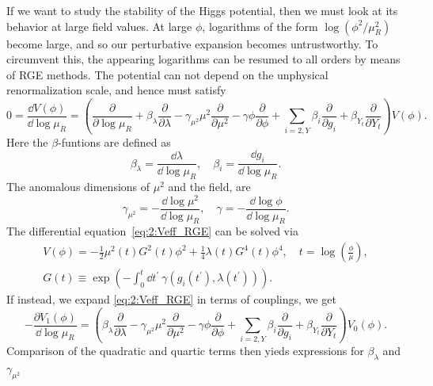 If we want to study the stability of the Higgs potential, then we must look at its behavior at large field values. At large $\phi$, logarithms of the form $\log (\phi^2/\mu_R^2)$ become large, and so our perturbative expansion becomes untrustworthy. To circumvent this, the appearing logarithms can be resumed to all orders by means of \acs{RGE} methods. The potential can not depend on the unphysical renormalization scale, and hence must satisfy
\begin{equation}
0 = \frac{\dd V(\phi)}{\dd \log \mu_R} = \left( \frac{\partial}{\partial \log \mu_R} + \beta_\lambda \frac{\partial}{\partial \lambda} - \gamma_{\mu^2} \mu^2 \frac{\partial}{\partial \mu^2} - \gamma \phi \frac{\partial}{\partial \phi} + \sum_{i= 2, Y} \beta_i \frac{\partial }{\partial g_i} + \beta_{Y_t} \frac{\partial }{\partial Y_t} \right) V(\phi).
\label{eq:2:Veff_RGE}
\end{equation}
Here the $\beta$-funtions are defined as
\begin{equation}
\beta_\lambda = \frac{\dd \lambda}{\dd \log \mu_R}, \quad \beta_i = \frac{\dd g_i}{\dd \log \mu_R}.
\end{equation}
The anomalous dimensions of $\mu^2$ and the field, are
\begin{equation}
\gamma_{\mu^2} = - \frac{\dd \log \mu^2}{\dd \log \mu_R}, \quad \gamma = - \frac{\dd \log \phi}{\dd \log \mu_R}.
\end{equation}
The differential equation~\eqref{eq:2:Veff_RGE} can be solved via
\begin{equation}
\begin{gathered}
V (\phi) = -\frac{1}{2} \mu^2(t) G^2(t) \phi^2 + \frac{1}{4} \lambda(t) G^4(t) \phi^4, \quad t = \log\left( \frac{\phi}{\mu} \right), \\
G(t) \equiv \exp \left(- \int_0^t \dd t^\prime \ \gamma(g_i (t^\prime), \lambda (t^\prime)) \right).
\end{gathered}
\label{eq:2:Veff_solution}
\end{equation}
If instead, we expand \eqref{eq:2:Veff_RGE} in terms of couplings, we get
\begin{equation}
-\frac{\partial V_1(\phi)}{\dd \log \mu_R} = \left( \beta_\lambda \frac{\partial}{\partial \lambda} - \gamma_{\mu^2} \mu^2 \frac{\partial}{\partial \mu^2} - \gamma \phi \frac{\partial}{\partial \phi} + \sum_{i= 2, Y} \beta_i \frac{\partial }{\partial g_i} + \beta_{Y_t} \frac{\partial }{\partial Y_t} \right) V_0(\phi).
\end{equation}
Comparison of the quadratic and quartic terms then yieds expressions for $\beta_\lambda$ and $\gamma_{\mu^2}$
